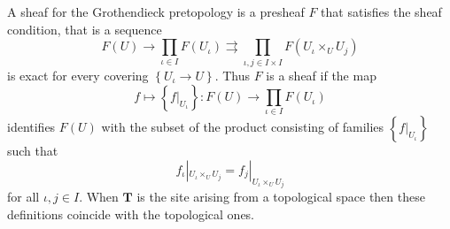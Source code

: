 \documentclass{beamer}
\theoremstyle{plain}
\newcommand{\be}{\begin{equation}}
\newcommand{\ee}{\end{equation}}
\begin{document}
\begin{frame}
\begin{definition}\label{etale_sheaf_defn}
	A \alert{sheaf} for the Grothendieck pretopology
	is a presheaf $ F$ 
	that satisfies the sheaf condition, that is a sequence 
	\be\label{etale_sheaf_eqn}
	 F \left(U\right) \to \prod_{\iota \in I}  F \left(U_\iota \right)\rightrightarrows  \prod_{\iota, j \in I\times I}  F \left(U_\iota \times_U U_j\right)
	\ee
	is exact for every covering $\left\{U_\iota \to U\right\}$. Thus $ F$ 
	is a sheaf if the map 
	$$
	f \mapsto \left\{f|_{U_\iota }\right\}: F \left(U\right) \to \prod_{\iota \in I}  F \left(U_\iota \right)
	$$
	identifies $ F\left( U\right)$ with the subset of the product consisting of families $\left\{f|_{U_\iota }\right\}$ such that 
	$$
	f_\iota|_{U_\iota \times_U U_j}= f_j|_{U_\iota \times_U U_j}
	$$
	for all $\iota, j \in I$. 
	When $\mathbf T$ 
	is the site arising from a topological space then these definitions coincide with the 
	topological ones. 
	
\end{definition}
\end{frame}
\end{document}
